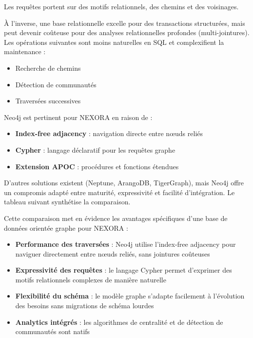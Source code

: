 \documentclass[12pt,a4paper]{report}
\begin{document}
Les requêtes portent sur des motifs relationnels, des chemins et des voisinages.

À l'inverse, une base relationnelle excelle pour des transactions structurées, mais peut devenir coûteuse pour des analyses relationnelles profondes (multi-jointures). Les opérations suivantes sont moins naturelles en SQL et complexifient la maintenance :
\begin{itemize}
  \item Recherche de chemins
  \item Détection de communautés
  \item Traversées successives
\end{itemize}

Neo4j est pertinent pour NEXORA en raison de :
\begin{itemize}
  \item \textbf{Index-free adjacency} : navigation directe entre nœuds reliés
  \item \textbf{Cypher} : langage déclaratif pour les requêtes graphe
  \item \textbf{Extension APOC} : procédures et fonctions étendues
\end{itemize}

D'autres solutions existent (Neptune, ArangoDB, TigerGraph), mais Neo4j offre un compromis adapté entre maturité, expressivité et facilité d'intégration. Le tableau suivant synthétise la comparaison.

Cette comparaison met en évidence les avantages spécifiques d'une base de données orientée graphe pour NEXORA :
\begin{itemize}
  \item \textbf{Performance des traversées} : Neo4j utilise l'index-free adjacency pour naviguer directement entre nœuds reliés, sans jointures coûteuses
  \item \textbf{Expressivité des requêtes} : le langage Cypher permet d'exprimer des motifs relationnels complexes de manière naturelle
  \item \textbf{Flexibilité du schéma} : le modèle graphe s'adapte facilement à l'évolution des besoins sans migrations de schéma lourdes
  \item \textbf{Analytics intégrés} : les algorithmes de centralité et de détection de communautés sont natifs
\end{itemize}
\end{document}
